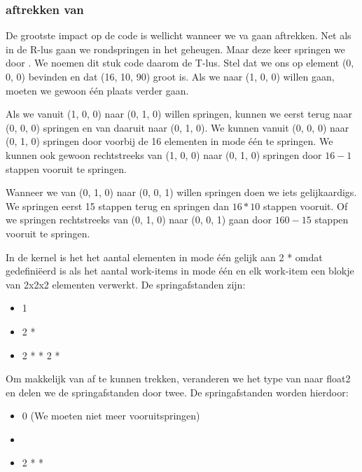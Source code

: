 \subsubsection{\TT{} aftrekken van \CC{}}
De grootste impact op de code is wellicht wanneer we \TT{} va \CC{} gaan aftrekken.  Net als in de R-lus gaan we rondspringen in het geheugen. Maar deze keer springen we door \TT{}.  We noemen dit stuk code daarom de T-lus. Stel dat we ons op element (0, 0, 0) bevinden en dat \TT{} (16, 10, 90) groot is. Als we naar (1, 0, 0) willen gaan, moeten we gewoon \'e\'en plaats verder gaan.

Als we vanuit (1, 0, 0) naar (0, 1, 0) willen springen, kunnen we eerst terug naar (0, 0, 0) springen en van daaruit naar (0, 1, 0). We kunnen vanuit (0, 0, 0) naar (0, 1, 0) springen door voorbij de 16 elementen in mode \'e\'en te springen. We kunnen ook gewoon rechtstreeks van (1, 0, 0) naar (0, 1, 0) springen door $16-1$ stappen vooruit te springen.

Wanneer we van (0, 1, 0) naar (0, 0, 1) willen springen doen we iets gelijkaardigs. We springen eerst 15 stappen terug en springen dan $16 * 10$ stappen vooruit. Of we springen rechtstreeks van (0, 1, 0) naar (0, 0, 1) gaan door $160 - 15$ stappen vooruit te springen.

In de kernel is het het aantal elementen in mode \'e\'en gelijk aan 2 *  omdat  gedefini\"eerd is als het aantal work-items in mode \'e\'en en elk work-item een blokje van 2x2x2 elementen verwerkt. De springafstanden zijn:
\begin{itemize}
    \item 1
    \item 2 * 
    \item 2 *  * 2 * 
\end{itemize}
Om \TT makkelijk van \CC af te kunnen trekken, veranderen we het type van \TT naar float2 en delen we de springafstanden door twee. De springafstanden worden hierdoor:
\begin{itemize}
	\item 0 (We moeten niet meer vooruitspringen)
    \item {}
    \item 2 *  * 
\end{itemize}

